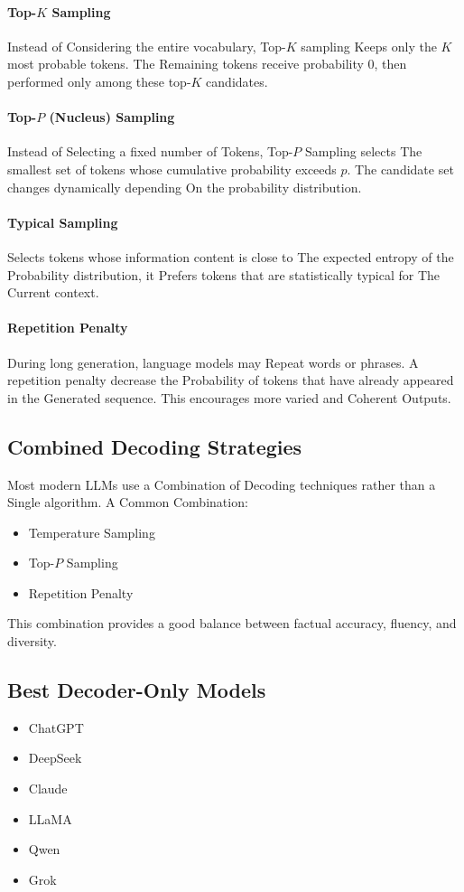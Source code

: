 \paragraph{Top-$K$ Sampling}
Instead of Considering the entire vocabulary, Top-$K$ sampling Keeps only the $K$ most probable tokens. The Remaining tokens receive probability 0, then performed only among these top-$K$ candidates.

\paragraph{Top-$P$ (Nucleus) Sampling}
Instead of Selecting a fixed number of Tokens, Top-$P$ Sampling selects The smallest set of tokens whose cumulative probability exceeds $p$. The candidate set changes dynamically depending On the probability distribution.

\paragraph{Typical Sampling}
Selects tokens whose information content is close to The expected entropy of the Probability distribution, it Prefers tokens that are statistically typical for The Current context.

\paragraph{Repetition Penalty}
During long generation, language models may Repeat words or phrases. A repetition penalty decrease the Probability of tokens that have already appeared in the Generated sequence. This encourages more varied and Coherent Outputs.

\subsection{Combined Decoding Strategies}

Most modern LLMs use a Combination of Decoding techniques rather than a Single algorithm. A Common Combination:
\begin{itemize}
    \item Temperature Sampling
    \item Top-$P$ Sampling
    \item Repetition Penalty
\end{itemize}

This combination provides a good balance between factual accuracy, fluency, and diversity.

\subsection{Best Decoder-Only Models}
\begin{itemize}
    \item ChatGPT
    \item DeepSeek
    \item Claude
    \item LLaMA
    \item Qwen
    \item Grok
\end{itemize}
